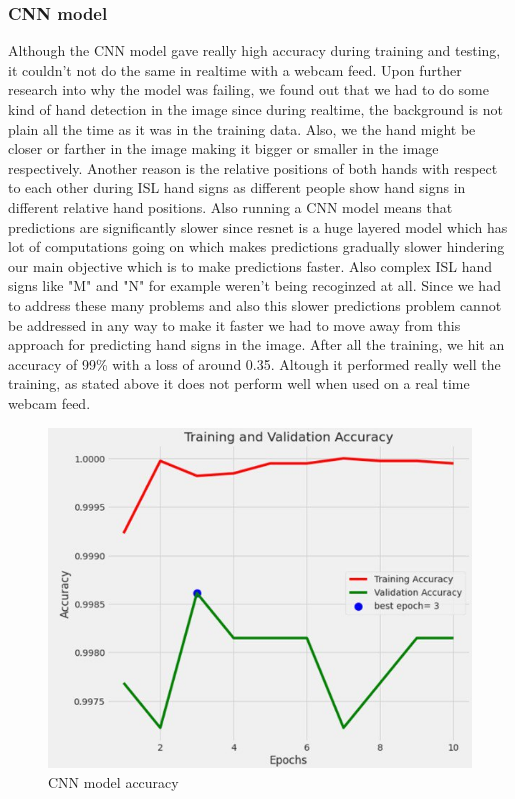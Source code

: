 \documentclass[12pt,a4paper]{report}
\begin{document}
\subsubsection{CNN model}
Although the CNN model gave really high accuracy during training and testing, it couldn't not do the same in realtime with a webcam feed. Upon further research into why the model was failing, we found out that we had to do some kind of hand detection in the image since during realtime, the background is not plain all the time as it was in the training data. Also, we the hand might be closer or farther in the image making it bigger or smaller in the image respectively. Another reason is the relative positions of both hands with respect to each other during ISL hand signs as different people show hand signs in different relative hand positions. Also running a CNN model means that predictions are significantly slower since resnet is a huge layered model which has lot of computations going on which makes predictions gradually slower hindering our main objective which is to make predictions faster. Also complex ISL hand signs like "M" and "N" for example weren't being recoginzed at all. Since we had to address these many problems and also this slower predictions problem cannot be addressed in any way to make it faster we had to move away from this approach for predicting hand signs in the image. After all the training, we hit an accuracy of 99\% with a loss of around 0.35. Altough it performed really well the training, as stated above it does not perform well when used on a real time webcam feed.
\begin{figure}[htbp]
	\centerline{\includegraphics[scale=0.5]{cnn_accuracy.jpg}}
	\caption{CNN model accuracy}
	\label{Cnn_accuracy}
\end{figure}
\end{document}
